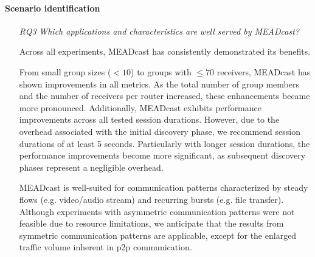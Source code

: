 
\paragraph{Scenario identification} %
\label{par:discussion_scenario}
\begin{itemize}
\item[\textit{RQ3}]
    \textit{Which applications and characteristics are well served by MEADcast?}

    Across all experiments, MEADcast has consistently demonstrated its
        benefits.

    From small group sizes ($<10$) to groups with $\leq 70$ receivers, MEADcast
        has shown improvements in all metrics.
    As the total number of group members and the number of receivers per
        router increased, these enhancements became more pronounced.
    Additionally, MEADcast exhibits performance improvements across all tested
        session durations.
    However, due to the overhead associated with the initial discovery phase,
        we recommend session durations of at least 5 seconds.
    Particularly with longer session durations, the performance improvements
        become more significant, as subsequent discovery phases represent a
        negligible overhead.

    MEADcast is well-suited for communication patterns characterized by steady
        flows (e.g. video/audio stream) and recurring bursts (e.g. file
        transfer).
    Although experiments with asymmetric communication patterns were not
        feasible due to resource limitations, we anticipate that the results
        from symmetric communication patterns are applicable, except for the
        enlarged traffic volume inherent in \gls{p2p} communication.


\end{itemize}
